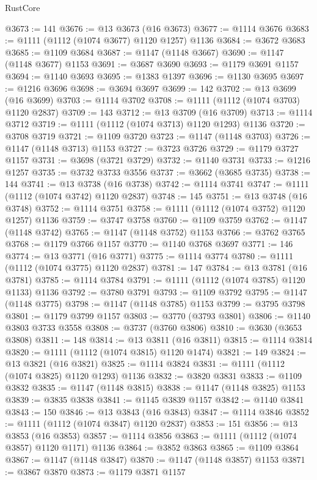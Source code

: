 \begin{lexlean}{RustCore}
\begin{coremodule}
@3673 := 141
@3676 := @13 @3673 (@16 @3673)
@3677 := @1114 @3676
@3683 := @1111 (@1112 (@1074 @3677) @1120 @1257) @1136
@3684 := @3672 @3683
@3685 := @1109 @3684
@3687 := @1147 (@1148 @3667)
@3690 := @1147 (@1148 @3677) @1153
@3691 := @3687 @3690
@3693 := @1179 @3691 @1157
@3694 := @1140 @3693
@3695 := @1383 @1397
@3696 := @1130 @3695
@3697 := @1216 @3696
@3698 := @3694 @3697
@3699 := 142
@3702 := @13 @3699 (@16 @3699)
@3703 := @1114 @3702
@3708 := @1111 (@1112 (@1074 @3703) @1120 @2837)
@3709 := 143
@3712 := @13 @3709 (@16 @3709)
@3713 := @1114 @3712
@3719 := @1111 (@1112 (@1074 @3713) @1120 @1293) @1136
@3720 := @3708 @3719
@3721 := @1109 @3720
@3723 := @1147 (@1148 @3703)
@3726 := @1147 (@1148 @3713) @1153
@3727 := @3723 @3726
@3729 := @1179 @3727 @1157
@3731 := @3698 (@3721 @3729)
@3732 := @1140 @3731
@3733 := @1216 @1257
@3735 := @3732 @3733 @3556
@3737 := @3662 (@3685 @3735)
@3738 := 144
@3741 := @13 @3738 (@16 @3738)
@3742 := @1114 @3741
@3747 := @1111 (@1112 (@1074 @3742) @1120 @2837)
@3748 := 145
@3751 := @13 @3748 (@16 @3748)
@3752 := @1114 @3751
@3758 := @1111 (@1112 (@1074 @3752) @1120 @1257) @1136
@3759 := @3747 @3758
@3760 := @1109 @3759
@3762 := @1147 (@1148 @3742)
@3765 := @1147 (@1148 @3752) @1153
@3766 := @3762 @3765
@3768 := @1179 @3766 @1157
@3770 := @1140 @3768 @3697
@3771 := 146
@3774 := @13 @3771 (@16 @3771)
@3775 := @1114 @3774
@3780 := @1111 (@1112 (@1074 @3775) @1120 @2837)
@3781 := 147
@3784 := @13 @3781 (@16 @3781)
@3785 := @1114 @3784
@3791 := @1111 (@1112 (@1074 @3785) @1120 @1133) @1136
@3792 := @3780 @3791
@3793 := @1109 @3792
@3795 := @1147 (@1148 @3775)
@3798 := @1147 (@1148 @3785) @1153
@3799 := @3795 @3798
@3801 := @1179 @3799 @1157
@3803 := @3770 (@3793 @3801)
@3806 := @1140 @3803 @3733 @3558
@3808 := @3737 (@3760 @3806)
@3810 := @3630 (@3653 @3808)
@3811 := 148
@3814 := @13 @3811 (@16 @3811)
@3815 := @1114 @3814
@3820 := @1111 (@1112 (@1074 @3815) @1120 @1474)
@3821 := 149
@3824 := @13 @3821 (@16 @3821)
@3825 := @1114 @3824
@3831 := @1111 (@1112 (@1074 @3825) @1120 @1293) @1136
@3832 := @3820 @3831
@3833 := @1109 @3832
@3835 := @1147 (@1148 @3815)
@3838 := @1147 (@1148 @3825) @1153
@3839 := @3835 @3838
@3841 := @1145 @3839 @1157
@3842 := @1140 @3841
@3843 := 150
@3846 := @13 @3843 (@16 @3843)
@3847 := @1114 @3846
@3852 := @1111 (@1112 (@1074 @3847) @1120 @2837)
@3853 := 151
@3856 := @13 @3853 (@16 @3853)
@3857 := @1114 @3856
@3863 := @1111 (@1112 (@1074 @3857) @1120 @1171) @1136
@3864 := @3852 @3863
@3865 := @1109 @3864
@3867 := @1147 (@1148 @3847)
@3870 := @1147 (@1148 @3857) @1153
@3871 := @3867 @3870
@3873 := @1179 @3871 @1157

\end{coremodule}
\end{lexlean}
